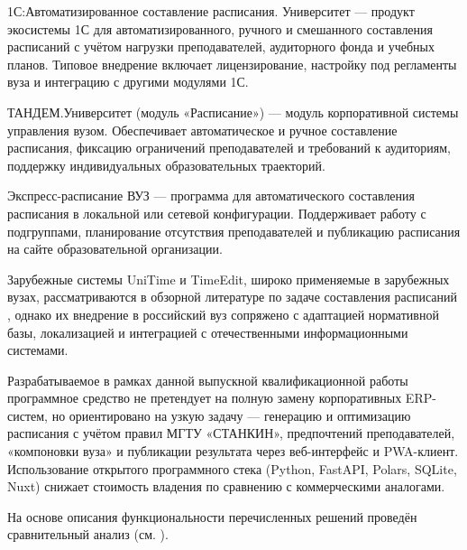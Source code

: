 1С:Автоматизированное составление расписания. Университет \cite{1c:schedule} --- продукт экосистемы 1С для автоматизированного, ручного и смешанного составления расписаний с учётом нагрузки преподавателей, аудиторного фонда и учебных планов. Типовое внедрение включает лицензирование, настройку под регламенты вуза и интеграцию с другими модулями 1С.

ТАНДЕМ.Университет (модуль «Расписание») \cite{tandem:schedule} --- модуль корпоративной системы управления вузом. Обеспечивает автоматическое и ручное составление расписания, фиксацию ограничений преподавателей и требований к аудиториям, поддержку индивидуальных образовательных траекторий.

Экспресс-расписание ВУЗ \cite{express:schedule} --- программа для автоматического составления расписания в локальной или сетевой конфигурации. Поддерживает работу с подгруппами, планирование отсутствия преподавателей и публикацию расписания на сайте образовательной организации.

Зарубежные системы UniTime и TimeEdit, широко применяемые в зарубежных вузах, рассматриваются в обзорной литературе по задаче составления расписаний \cite{vrielink:patat2016}, однако их внедрение в российский вуз сопряжено с адаптацией нормативной базы, локализацией и интеграцией с отечественными информационными системами.

Разрабатываемое в рамках данной выпускной квалификационной работы программное средство не претендует на полную замену корпоративных ERP-систем, но ориентировано на узкую задачу --- генерацию и оптимизацию расписания с учётом правил МГТУ «СТАНКИН», предпочтений преподавателей, «компоновки вуза» и публикации результата через веб-интерфейс и PWA-клиент. Использование открытого программного стека (Python, FastAPI, Polars, SQLite, Nuxt) снижает стоимость владения по сравнению с коммерческими аналогами.

На основе описания функциональности перечисленных решений проведён сравнительный анализ (см. ).

